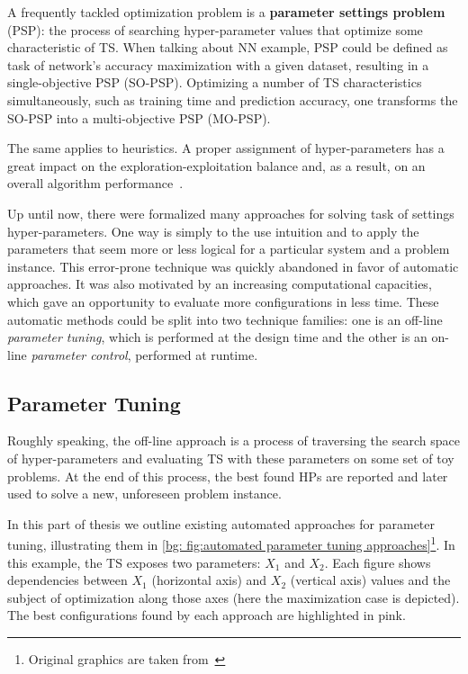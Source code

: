 A frequently tackled optimization problem is a \textbf{parameter settings problem} (PSP): the process of searching hyper-parameter values that optimize some characteristic of TS. When talking about NN example, PSP could be defined as task of network's accuracy maximization with a given dataset, resulting in a single-objective PSP (SO-PSP). Optimizing a number of TS characteristics simultaneously, such as training time and prediction accuracy, one transforms the SO-PSP into a multi-objective PSP (MO-PSP).

The same applies to heuristics. A proper assignment of hyper-parameters has a great impact on the exploration-exploitation balance and, as a result, on an overall algorithm performance~\cite{lavesson2006quantifying}.

Up until now, there were formalized many approaches for solving task of settings hyper-parameters. 
One way is simply to the use intuition and to apply the parameters that seem more or less logical for a particular system and a problem instance. This error-prone technique was quickly abandoned in favor of automatic approaches. It was also motivated by an increasing computational capacities, which gave an opportunity to evaluate more configurations in less time. These automatic methods could be split into two technique families: one is an off-line \emph{parameter tuning}, which is performed at the design time and the other is an on-line \emph{parameter control}, performed at runtime.


\subsection{Parameter Tuning}\label{bg: parameter tuning}
Roughly speaking, the off-line approach is a process of traversing the search space of hyper-parameters and evaluating TS with these parameters on some set of toy problems. At the end of this process, the best found HPs are reported and later used to solve a new, unforeseen problem instance.

In this part of thesis we outline existing automated approaches for parameter tuning, illustrating them in \cref{bg: fig:automated parameter tuning approaches}\footnote{Original graphics are taken from~\cite{koch2017automated}}. In this example, the TS exposes two parameters: $X_1$ and $X_2$. Each figure shows dependencies between $X_1$ (horizontal axis) and $X_2$ (vertical axis) values and the subject of optimization along those axes (here the maximization case is depicted). The best configurations found by each approach are highlighted in pink.

